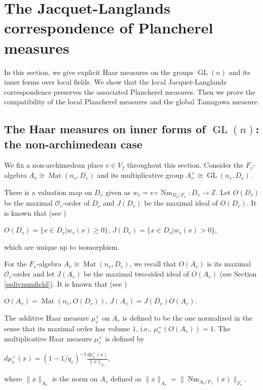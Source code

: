 \documentclass[11pt]{article}
\theoremstyle{plain}
\theoremstyle{remark}
\theoremstyle{definition}
\DeclareMathOperator{\Nm}{Nm}
\DeclareMathOperator{\GL}{GL}
\DeclareMathOperator{\Mt}{Mat}
\begin{document}
\section{The Jacquet-Langlands correspondence of Plancherel measures}\label{sJLmeas}

In this section, we give explicit Haar measures on the groups $\GL(n)$ and its inner forms over local fields. 
We show that the local Jacquet-Langlands correspondence preserves the associated Plancherel measures. 
Then we prove the compatibility of the local Plancherel measures and the global Tamagawa measure. 
 

\subsection{The Haar measures on inner forms of $\GL(n)$: the non-archimedean case}\label{ssHaarp}


We fix a non-archimedean place $v\in V_f$ throughout this section. 
Consider the $F_v$-algebra $A_v\cong \Mt(n_v,D_v)$ and its multiplicative group $A_v^{\times}\cong \GL(n_v,D_v)$. 

There is a valuation map on $D_v$ given as $w_v=v \circ \Nm_{D_v/F_v}\colon D_v\to \mathbb{Z}$. 
Let $O(D_v)$ be the maximal $\mathcal{O}_v$-order of $D_v$ and $J(D_v)$ be the maximal ideal of $O(D_v)$. 
It is known that (see \cite[Theorem 12.8 and 13.2]{Rei03})
\begin{center}
    $O(D_v)=\{x\in D_v|w_v(x)\geq 0\}$,  $J(D_v)=\{x\in D_v|w_v(x)> 0\}$, 
\end{center}
which are unique up to isomorphism. 

For the $F_v$-algebra $A_v\cong \Mt(n_v,D_v)$, we recall that $O(A_v)$ is its maximal $\mathcal{O}_v$-order and let $J(A_v)$ be the maximal two-sided ideal of $O(A_v)$ (see Section \ref{ssdivnumfield}).  
It is known that (see \cite[Theorem 17.3]{Rei03})
\begin{center}
    $O(A_v)=\Mt(n_v,O(D_v))$,  $J(A_v)=J(D_v)O(A_v)$. 
\end{center}
The additive Haar measure $\mu^{+}_v$ on $A_v$ is defined to be the one normalized in the sense that its maximal order has volume $1$, i.e., $\mu^{+}_v(O(A_v))=1$.  
The multiplicative Haar measure $\mu^{\times}_v$ is defined by
\begin{center}
    $d \mu^{\times}_v(x)=(1-1/q_v)^{-1} \frac{d \mu^{+}_v(x)}{\|x\|_{A_v}}$,
\end{center}
where $\|x\|_{A_v}$ is the norm on $A_v$ defined as $\|x\|_{A_v}=\|\Nm_{A_v/F_v}(x)\|_{F_v}$. 
\end{document}
